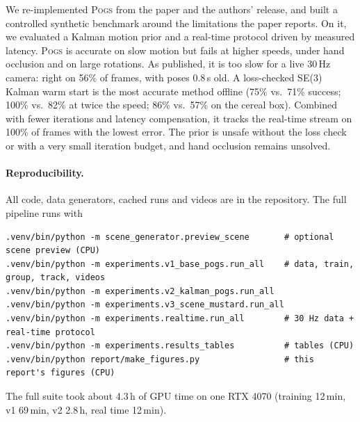 \documentclass[10pt,a4paper]{article}
\newcommand{\pogs}{\textsc{Pogs}}
\begin{document}
We re-implemented \pogs{} from the paper and the authors' release, and built a
controlled synthetic benchmark around the limitations the paper reports. On it,
we evaluated a Kalman motion prior and a real-time protocol driven by measured
latency. \pogs{} is accurate on slow motion but fails at higher speeds, under
hand occlusion and on large rotations. As published, it is too slow for a live
30\,Hz camera: right on 56\% of frames, with poses 0.8\,s old. A loss-checked
SE(3) Kalman warm start is the most accurate method offline (75\% vs.\ 71\%
success; 100\% vs.\ 82\% at twice the speed; 86\% vs.\ 57\% on the cereal box).
Combined with fewer iterations and latency compensation, it tracks the
real-time stream on 100\% of frames with the lowest error. The prior is unsafe
without the loss check or with a very small iteration budget, and hand
occlusion remains unsolved.

\paragraph{Reproducibility.} All code, data generators, cached runs and videos
are in the repository. The full pipeline runs with
\begin{verbatim}
.venv/bin/python -m scene_generator.preview_scene       # optional scene preview (CPU)
.venv/bin/python -m experiments.v1_base_pogs.run_all    # data, train, group, track, videos
.venv/bin/python -m experiments.v2_kalman_pogs.run_all
.venv/bin/python -m experiments.v3_scene_mustard.run_all
.venv/bin/python -m experiments.realtime.run_all        # 30 Hz data + real-time protocol
.venv/bin/python -m experiments.results_tables          # tables (CPU)
.venv/bin/python report/make_figures.py                 # this report's figures (CPU)
\end{verbatim}
The full suite took about 4.3\,h of GPU time on one RTX 4070 (training 12\,min,
v1 69\,min, v2 2.8\,h, real time 12\,min).
\end{document}
